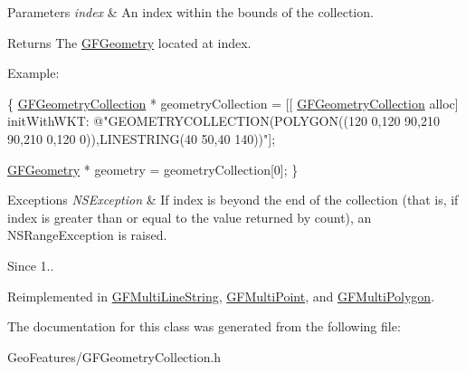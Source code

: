 \begin{DoxyParams}{Parameters}
{\em index} & An index within the bounds of the collection.\\
\hline
\end{DoxyParams}
\begin{DoxyReturn}{Returns}
The \hyperlink{interface_g_f_geometry}{G\+F\+Geometry} located at index.
\end{DoxyReturn}
Example\+:


\begin{DoxyCode}
\{
   \hyperlink{interface_g_f_geometry_collection}{GFGeometryCollection} * geometryCollection = [[
      \hyperlink{interface_g_f_geometry_collection}{GFGeometryCollection} alloc] initWithWKT: \textcolor{stringliteral}{@"GEOMETRYCOLLECTION(POLYGON((120 0,120 90,210
       90,210 0,120 0)),LINESTRING(40 50,40 140))"}];

   \hyperlink{interface_g_f_geometry}{GFGeometry} * geometry = geometryCollection[0];
\}
\end{DoxyCode}



\begin{DoxyExceptions}{Exceptions}
{\em N\+S\+Exception} & If index is beyond the end of the collection (that is, if index is greater than or equal to the value returned by count), an N\+S\+Range\+Exception is raised.\\
\hline
\end{DoxyExceptions}
\begin{DoxySince}{Since}
1.. 
\end{DoxySince}


Reimplemented in \hyperlink{interface_g_f_multi_line_string_af890018703b1499460cc379a1f498ea0}{G\+F\+Multi\+Line\+String}, \hyperlink{interface_g_f_multi_point_ae63934c501b12fa80e6ddaa739af16d9}{G\+F\+Multi\+Point}, and \hyperlink{interface_g_f_multi_polygon_a9336b76baf557cba039569fcf0c5dcd0}{G\+F\+Multi\+Polygon}.



The documentation for this class was generated from the following file\+:\begin{DoxyCompactItemize}
\item 
Geo\+Features/G\+F\+Geometry\+Collection.\+h\end{DoxyCompactItemize}

